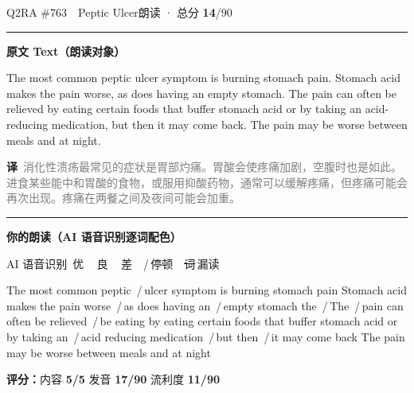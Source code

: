 \documentclass[11pt]{article}
\newcommand{\sfull}[1]{\textcolor{cFix}{\bfseries #1}}     %
\newcommand{\szero}[1]{\textcolor{cWrong}{\bfseries #1}}   %
\newcommand{\ptesub}[1]{%
  \par\needspace{2\baselineskip}\smallskip
  {\color{cAccent}\rule[-0.2ex]{3pt}{1.05em}}\hspace{6pt}%
  {\bfseries\color{cHead}#1}\par\nopagebreak\smallskip}
\newcommand{\sg}[1]{\textcolor{cSpkGood}{#1}}   %
\newcommand{\sy}[1]{\textcolor{cSpkOk}{#1}}     %
\newcommand{\sr}[1]{\textcolor{cSpkBad}{#1}}    %
\newcommand{\pse}{{\color{gray}\,/\,}}          %
\newcommand{\asrlegend}{{\footnotesize\color{gray}AI 语音识别\quad
  {\color{cSpkGood}\textbullet}\,优\ \ {\color{cSpkOk}\textbullet}\,良\ \
  {\color{cSpkBad}\textbullet}\,差\ \ {\color{gray}/}\,停顿\ \
  {\color{cSpkBad}\sout{词}}\,漏读}}
\newcommand{\zh}[1]{{\footnotesize\textcolor{cNote}{\textbf{译}}\ \textcolor{gray}{#1}}}
\begin{document}
\begin{qblock}{Q2\quad RA \#763\ \ Peptic Ulcer}{朗读 · 总分 \textcolor{cAccent}{\bfseries 14}/90}
\ptesub{原文 Text（朗读对象）}
\begin{promptbox}
The most common peptic ulcer symptom is burning stomach pain. Stomach acid makes the pain worse, as does having an empty stomach. The pain can often be relieved by eating certain foods that buffer stomach acid or by taking an acid-reducing medication, but then it may come back. The pain may be worse between meals and at night.
\end{promptbox}
\zh{消化性溃疡最常见的症状是胃部灼痛。胃酸会使疼痛加剧，空腹时也是如此。进食某些能中和胃酸的食物，或服用抑酸药物，通常可以缓解疼痛，但疼痛可能会再次出现。疼痛在两餐之间及夜间可能会加重。}
\ptesub{你的朗读（AI 语音识别逐词配色）}
\asrlegend
\begin{asrbox}
\sg{The} \sg{most} \sg{common} \sr{peptic} \pse \sr{ulcer} \sr{symptom} \sy{is} \sr{burning} \sr{stomach} \sg{pain} \sr{Stomach} \sg{acid} \sr{makes} \sg{the} \sg{pain} \sy{worse} \pse \sg{as} \sg{does} \sg{having} \sy{an} \pse \sg{empty} \sr{stomach} \sg{the} \pse \sg{The} \pse \sg{pain} \sg{can} \sg{often} \sg{be} \sr{relieved} \pse \sg{be} \sg{eating} \sr{by} \sr{eating} \sr{certain} \sr{foods} \sy{that} \sy{buffer} \sr{stomach} \sr{acid} \sy{or} \sg{by} \sg{taking} \sy{an} \pse \sr{acid} \sr{reducing} \sr{medication} \pse \sg{but} \sg{then} \pse \sg{it} \sg{may} \sg{come} \sg{back} \sg{The} \sr{pain} \sg{may} \sg{be} \sy{worse} \sg{between} \sy{meals} \sg{and} \sg{at} \sg{night}
\end{asrbox}
\smallskip
{\small\textbf{评分：}内容 \sfull{5/5} \quad\textperiodcentered\quad 发音 \szero{17/90} \quad\textperiodcentered\quad 流利度 \szero{11/90}}\quad{\footnotesize\color{gray}（用时 01:07）}
\end{qblock}
\end{document}
